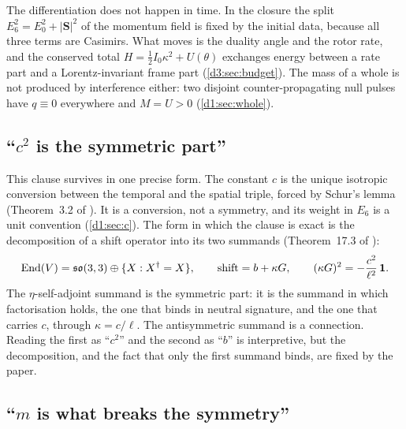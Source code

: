 The differentiation does not happen in time. In the closure the split $E_6^2=E_0^2+|\mathbf S|^2$ of the momentum field is fixed by the
initial data, because all three terms are Casimirs. What moves is the duality angle and the rotor rate, and the conserved total
$H=\tfrac12I_0\kappa^2+U(\theta)$ exchanges energy between a rate part and a Lorentz-invariant frame part (\cref{d3:sec:budget}). The mass
of a whole is not produced by interference either: two disjoint counter-propagating null pulses have $q\equiv0$ everywhere and $M=U>0$
(\cref{d1:sec:whole}).

\subsection{\texorpdfstring{``$c^2$ is the symmetric part''}{"c\textasciicircum 2 is the symmetric part"}}

This clause survives in one precise form. The constant $c$ is the unique isotropic conversion between the temporal and the spatial triple,
forced by Schur's lemma (Theorem~3.2 of \cite{ES17}). It is a conversion, not a symmetry, and its weight in $E_6$ is a unit convention
(\cref{d1:sec:c}). The form in which the clause is exact is the decomposition of a shift operator into its two summands
(Theorem~17.3 of \cite{ES17}):
\[
\operatorname{End}(V)=\mathfrak{so}(3,3)\oplus\{X:X^\dagger=X\},\qquad \text{shift}=b+\kappa G,\qquad (\kappa G)^2=-\frac{c^2}{\ell^2}\,\mathbf 1 .
\]
The $\eta$-self-adjoint summand is the symmetric part: it is the summand in which factorisation holds, the one that binds in neutral
signature, and the one that carries $c$, through $\kappa=c/\ell$. The antisymmetric summand is a connection. Reading the first as ``$c^2$''
and the second as ``$b$'' is interpretive, but the decomposition, and the fact that only the first summand binds, are fixed by the paper.

\subsection{\texorpdfstring{``$m$ is what breaks the symmetry''}{"m is what breaks the symmetry"}}

